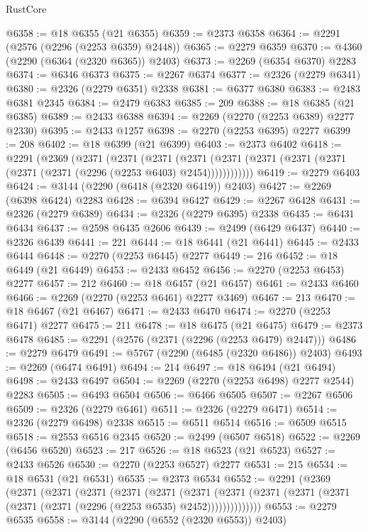 \begin{lexlean}{RustCore}
\begin{coremodule}
@6358 := @18 @6355 (@21 @6355)
@6359 := @2373 @6358
@6364 := @2291 (@2576 (@2296 (@2253 @6359) @2448))
@6365 := @2279 @6359
@6370 := @4360 (@2290 (@6364 (@2320 @6365)) @2403)
@6373 := @2269 (@6354 @6370) @2283
@6374 := @6346 @6373
@6375 := @2267 @6374
@6377 := @2326 (@2279 @6341)
@6380 := @2326 (@2279 @6351) @2338
@6381 := @6377 @6380
@6383 := @2483 @6381 @2345
@6384 := @2479 @6383
@6385 := 209
@6388 := @18 @6385 (@21 @6385)
@6389 := @2433 @6388
@6394 := @2269 (@2270 (@2253 @6389) @2277 @2330)
@6395 := @2433 @1257
@6398 := @2270 (@2253 @6395) @2277
@6399 := 208
@6402 := @18 @6399 (@21 @6399)
@6403 := @2373 @6402
@6418 := @2291
    (@2369
      (@2371
        (@2371
          (@2371
            (@2371 (@2371 (@2371 (@2371 (@2371 (@2371 (@2371 (@2296 (@2253 @6403) @2454))))))))))))
@6419 := @2279 @6403
@6424 := @3144 (@2290 (@6418 (@2320 @6419)) @2403)
@6427 := @2269 (@6398 @6424) @2283
@6428 := @6394 @6427
@6429 := @2267 @6428
@6431 := @2326 (@2279 @6389)
@6434 := @2326 (@2279 @6395) @2338
@6435 := @6431 @6434
@6437 := @2598 @6435 @2606
@6439 := @2499 (@6429 @6437)
@6440 := @2326 @6439
@6441 := 221
@6444 := @18 @6441 (@21 @6441)
@6445 := @2433 @6444
@6448 := @2270 (@2253 @6445) @2277
@6449 := 216
@6452 := @18 @6449 (@21 @6449)
@6453 := @2433 @6452
@6456 := @2270 (@2253 @6453) @2277
@6457 := 212
@6460 := @18 @6457 (@21 @6457)
@6461 := @2433 @6460
@6466 := @2269 (@2270 (@2253 @6461) @2277 @3469)
@6467 := 213
@6470 := @18 @6467 (@21 @6467)
@6471 := @2433 @6470
@6474 := @2270 (@2253 @6471) @2277
@6475 := 211
@6478 := @18 @6475 (@21 @6475)
@6479 := @2373 @6478
@6485 := @2291 (@2576 (@2371 (@2296 (@2253 @6479) @2447)))
@6486 := @2279 @6479
@6491 := @5767 (@2290 (@6485 (@2320 @6486)) @2403)
@6493 := @2269 (@6474 @6491)
@6494 := 214
@6497 := @18 @6494 (@21 @6494)
@6498 := @2433 @6497
@6504 := @2269 (@2270 (@2253 @6498) @2277 @2544) @2283
@6505 := @6493 @6504
@6506 := @6466 @6505
@6507 := @2267 @6506
@6509 := @2326 (@2279 @6461)
@6511 := @2326 (@2279 @6471)
@6514 := @2326 (@2279 @6498) @2338
@6515 := @6511 @6514
@6516 := @6509 @6515
@6518 := @2553 @6516 @2345
@6520 := @2499 (@6507 @6518)
@6522 := @2269 (@6456 @6520)
@6523 := 217
@6526 := @18 @6523 (@21 @6523)
@6527 := @2433 @6526
@6530 := @2270 (@2253 @6527) @2277
@6531 := 215
@6534 := @18 @6531 (@21 @6531)
@6535 := @2373 @6534
@6552 := @2291
    (@2369
      (@2371
        (@2371
          (@2371
            (@2371
              (@2371
                (@2371
                  (@2371 (@2371 (@2371 (@2371 (@2371 (@2371 (@2296 (@2253 @6535) @2452))))))))))))))
@6553 := @2279 @6535
@6558 := @3144 (@2290 (@6552 (@2320 @6553)) @2403)

\end{coremodule}
\end{lexlean}
